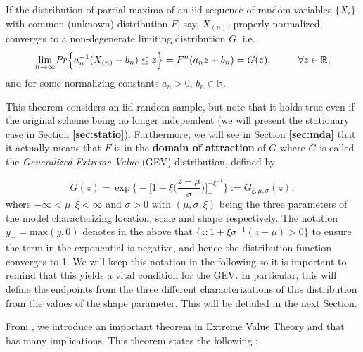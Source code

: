 \begin{theorem} \label{extthm}
	If the distribution of partial maxima of an iid sequence of  random variables $\{X_i\}$ with  common  (unknown)  distribution $F$, say, $X_{(n)}$, properly normalized, converges to a non-degenerate limiting distribution $G$, i.e.
	\begin{equation} \label{exttheom}
	\displaystyle{\lim_{n \to \infty}}\text{\emph{Pr}}\Big\{ a_n^{-1}(X_{(n)}-b_n)\leq z\Big\}=F^n(a_nz+b_n)
	= G(z), \ \ \ \ \ \ \ \ \forall z\in\mathbb{R},
	\end{equation}
	and for some normalizing constants $a_n>0$, $b_n\in\mathbb{R}$.
\end{theorem}
This theorem considers an iid random sample, but note that it holds true even if the original scheme 
being no longer independent (we will present the stationary case in 
\hyperref[sec:statio]{Section \textbf{\ref{sec:statio}}}). %
Furthermore, we will see in \hyperref[sec:mda]{Section \textbf{\ref{sec:mda}}} that it actually means that $F$ is in the \textbf{domain of attraction} of $G$ where
$G$ is called the \textit{Generalized Extreme Value} (GEV) distribution, defined by

\begin{equation} \label{gevgen}
G(z)=\ \text{exp}\ \Bigg\{-\bigg[1+\xi\bigg(\frac{z-\mu}{\sigma}\bigg)\bigg]_+^{-\xi^{-1}}\Bigg\}:=G_{\xi,\mu,\sigma}(z),
\end{equation}
where $-\infty<\mu,\xi<\infty$ and $\sigma>0$ with 
$(\mu,\sigma,\xi)$ being the three parameters of the model characterizing location, 
scale and shape respectively. The notation $y_+=\text{max}(y,0)$ denotes in the above that 
$\big\{z:1+\xi\sigma^{-1}(z-\mu)>0\big\}$ to ensure the term in the exponential is negative, and hence the 
distribution function converges to 1. We will keep this notation in the following so it is important to remind that this yields a vital condition for the GEV. In particular, this will define the endpoints from the three different characterizations of this distribution from the values of the shape 
parameter. This will be detailed in the \hyperref[sec:gevdistri]{next 
Section}.



From \cite{coles_introduction_2001}, we introduce an important theorem in Extreme Value Theory and that has many implications. This theorem states the following :

